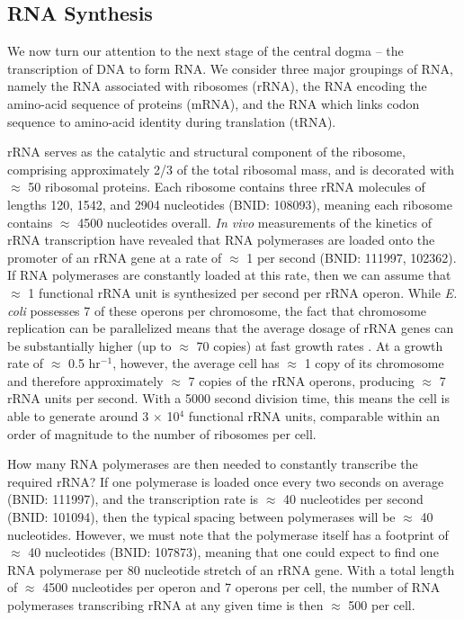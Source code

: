 \subsection{RNA Synthesis}\label{sec:RNA_synthesis}
We now turn our attention to the next stage of the central dogma -- the
transcription of DNA to form RNA. We consider three major groupings
of RNA, namely the RNA associated with ribosomes (rRNA), the RNA encoding the
amino-acid sequence of proteins (mRNA), and the RNA which links codon
sequence to amino-acid identity during translation (tRNA).


rRNA serves as the catalytic and structural component of the ribosome,
comprising approximately 2/3 of the total ribosomal mass, and is decorated
with $\approx$ 50 ribosomal proteins. Each ribosome contains three rRNA
molecules of lengths 120, 1542, and 2904 nucleotides (BNID: 108093), meaning
each ribosome contains $\approx$ 4500 nucleotides overall. \textit{In vivo}
measurements of the kinetics of rRNA transcription have revealed that RNA
polymerases are loaded onto the promoter of an rRNA gene at a rate of
$\approx$ 1 per second (BNID: 111997, 102362). If RNA polymerases are
constantly loaded at this rate, then we can assume that $\approx$ 1
functional rRNA unit is synthesized per second per rRNA operon. While
\textit{E. coli} possesses 7 of these operons per chromosome, the fact that
chromosome replication can be parallelized means that the average dosage of
rRNA genes can be substantially higher (up to $\approx$ 70 copies) at fast
growth rates \citep{dennis2004}. At a growth rate of $\approx$ 0.5 hr$^{-1}$, however, the
average cell has $\approx$ 1 copy of its chromosome and therefore
approximately $\approx$ 7 copies of the rRNA operons, producing
$\approx$ 7 rRNA units per second. With a 5000 second division time, this
means the cell is able to generate around 3 $\times$ 10$^4$ functional rRNA
units, comparable within an order of magnitude to the number of ribosomes per
cell.

How many RNA polymerases are then needed to constantly transcribe the required
rRNA? If one polymerase is loaded once every two seconds on average (BNID:
111997), and the transcription rate is $\approx$ 40 nucleotides per second
(BNID: 101094), then the typical spacing between polymerases will be $\approx$
40 nucleotides. However, we must note that the polymerase itself has a footprint
of $\approx$ 40 nucleotides (BNID: 107873), meaning that one could expect to
find one RNA polymerase per 80 nucleotide stretch of an rRNA gene. With a total
length of $\approx$ 4500 nucleotides per operon and 7 operons per cell, the
number of RNA polymerases transcribing rRNA at any given time is then $\approx$
500 per cell.

